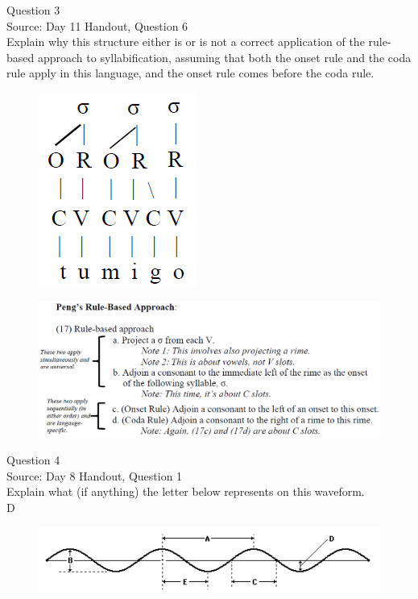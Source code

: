 \documentclass[12pt]{article}
\begin{document}
\newpage

{\large Question 3}\\

Source: Day 11 Handout, Question 6\\

Explain why this structure either is or is not a correct application of the rule-based approach to syllabification, assuming that both the onset rule and the coda rule apply in this language, and the onset rule comes before the coda rule.\\

\begin{figure}[H]
\includegraphics{../images/pengrules_tumigo_no.png}
\end{figure}
\begin{figure}[H]
\includegraphics{../images/peng_rules.png}
\end{figure}

\newpage

{\large Question 4}\\

Source: Day 8 Handout, Question 1\\

Explain what (if anything) the letter below represents on this waveform.\\

D

\begin{figure}[H]
\includegraphics{../images/sinusoid.png}
\end{figure}
\end{document}
